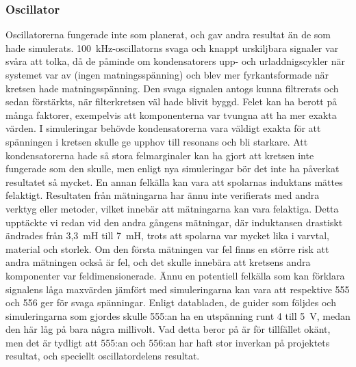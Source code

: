 \documentclass[a4paper]{article}
\makeatletter
\let\\\@raggedtwoe@savedcr%
\makeatother
\begin{document}
\begin{sloppypar}
    \subsubsection{Oscillator}
    Oscillatorerna fungerade inte som planerat, och gav andra resultat än de som hade simulerats.
    100~kHz-oscillatorns svaga och knappt urskiljbara signaler var svåra att tolka, då de påminde om kondensatorers upp- och urladdnigscykler när systemet var av (ingen matningsspänning) och blev mer fyrkantsformade när kretsen hade matningsspänning.
    Den svaga signalen antogs kunna filtrerats och sedan förstärkts, när filterkretsen väl hade blivit byggd.
    Felet kan ha berott på många faktorer, exempelvis att komponenterna var tvungna att ha mer exakta värden.
    I simuleringar behövde kondensatorerna vara väldigt exakta för att spänningen i kretsen skulle ge upphov till resonans och bli starkare.
    Att kondensatorerna hade så stora felmarginaler kan ha gjort att kretsen inte fungerade som den skulle, men enligt nya simuleringar bör det inte ha påverkat resultatet så mycket.
    \\\\
    En annan felkälla kan vara att spolarnas induktans mättes felaktigt. Resultaten från mätningarna har ännu inte verifierats med andra verktyg eller metoder, vilket innebär att mätningarna kan vara felaktiga.
    Detta upptäckte vi redan vid den andra gångens mätningar, där induktansen drastiskt ändrades från 3,3~mH till 7~mH, trots att spolarna var mycket lika i varvtal, material och storlek. Om den första mätningen var fel finns en större risk att andra mätningen också är fel, och det skulle innebära att kretsens andra komponenter var feldimensionerade.
    \\\\
    Ännu en potentiell felkälla som kan förklara signalens låga maxvärden jämfört med simuleringarna kan vara att respektive 555 och 556 ger för svaga spänningar. Enligt databladen, de guider som följdes och simuleringarna som gjordes skulle 555:an ha en utspänning runt 4 till 5~V, medan den här låg på bara några millivolt.
    Vad detta beror på är för tillfället okänt, men det är tydligt att 555:an och 556:an har haft stor inverkan på projektets resultat, och speciellt oscillatordelens resultat.

\end{sloppypar}
\end{document}
